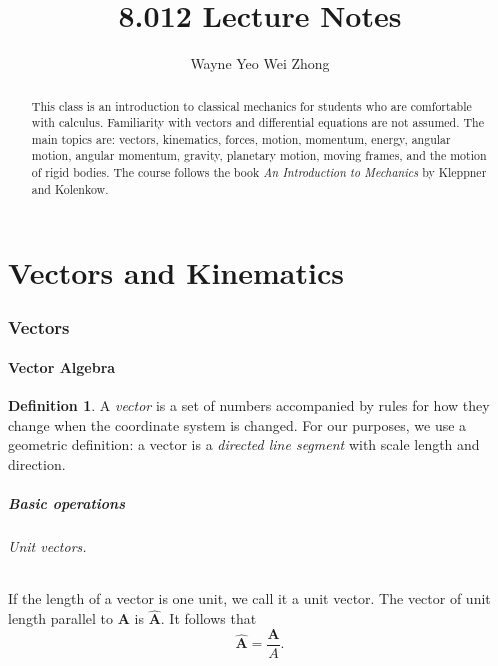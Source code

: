 \documentclass{article}
\title{8.012 Lecture Notes}
\author{Wayne Yeo Wei Zhong}
\numberwithin{theorem}{section}
\numberwithin{corollary}{section}
\numberwithin{postulate}{section}
\numberwithin{lemma}{section}
\theoremstyle{definition}
\numberwithin{definition}{section}
\newtheorem*{definition*}{Definition}
\renewcommand{\vec}[1]{\mathbf{#1}}
\let\oldhat\hat
\renewcommand{\hat}[1]{\oldhat{\mathbf{#1}}}
\begin{document}
\maketitle

\begin{abstract}
  This class is an introduction to classical mechanics for students who are
  comfortable with calculus. Familiarity with vectors and differential equations
  are not assumed. The main topics are:
  vectors, kinematics, forces, motion, momentum, energy, angular motion, angular
  momentum, gravity, planetary motion, moving frames, and the motion of rigid
  bodies. The course follows the book \emph{An Introduction to Mechanics} by
  Kleppner and Kolenkow.
\end{abstract}
\tableofcontents
\newpage

\part{Vectors and Kinematics}

\setcounter{section}{0}
\section{Vectors}

\subsection{Vector Algebra}

\begin{definition*}
  A \emph{vector} is a set of numbers accompanied by rules for how they change
  when the coordinate system is changed. For our purposes, we use a geometric
  definition: a vector is a \emph{directed line segment} with scale length and
  direction.
\end{definition*}

\subsubsection{Basic operations}

\paragraph{Unit vectors.} If the length of a vector is one unit, we call it a
unit vector. The vector of unit length parallel to $\vec{A}$ is $\hat{A}$. It
follows that \[
  \hat{A} = \frac{\vec{A}}{A}.
\]
\end{document}
